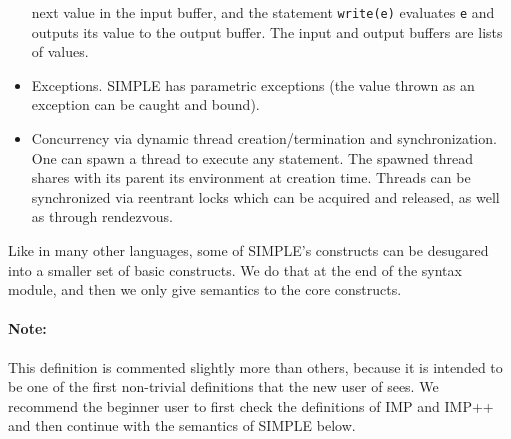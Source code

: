 \begin{latexComment}
\begin{itemize}
next value in the input buffer, and the statement \texttt{write(e)}
evaluates \texttt{e} and outputs its value to the output buffer.  The
input and output buffers are lists of values.
\item Exceptions.  SIMPLE has parametric exceptions (the value thrown as
an exception can be caught and bound).
\item Concurrency via dynamic thread creation/termination and
synchronization.  One can spawn a thread to execute any statement.
The spawned thread shares with its parent its environment at creation time.
Threads can be synchronized via reentrant locks which can be acquired and
released, as well as through rendezvous.

\end{itemize}
Like in many other languages, some of SIMPLE's constructs can be
desugared into a smaller set of basic constructs.  We do that at the end
of the syntax module, and then we only give semantics to the core constructs.

\paragraph{Note:}{
This definition is commented slightly more than others, because it is
intended to be one of the first non-trivial definitions that the new
user of \K sees.  We recommend the beginner user to first check the \K
definitions of IMP and IMP++ and then continue with the semantics of
SIMPLE below.}

\end{latexComment}

\vspace*{3ex}
